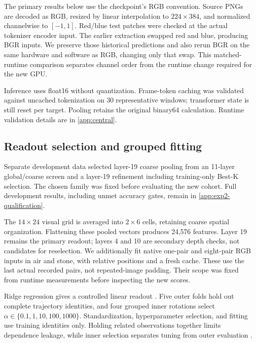 \documentclass{article}
\begin{document}
The primary results below use the checkpoint's RGB convention. Source PNGs are decoded as RGB, resized by linear interpolation to $224\times384$, and normalized channelwise to $[-1,1]$. Red/blue test patches were checked at the actual tokenizer encoder input. The earlier extraction swapped red and blue, producing BGR inputs. We preserve those historical predictions and also rerun BGR on the same hardware and software as RGB, changing only that swap. This matched-runtime comparison separates channel order from the runtime change required for the new GPU.

Inference uses float16 without quantization. Frame-token caching was validated against uncached tokenization on 30 representative windows; transformer state is still reset per target. Pooling retains the original binary64 calculation. Runtime validation details are in \autoref{app:central}.

\subsection{Readout selection and grouped fitting}
\label{sec:readouts}
Separate development data selected layer-19 coarse pooling from an 11-layer global/coarse screen and a layer-19 refinement including training-only Best-K selection. The chosen family was fixed before evaluating the new cohort. Full development results, including unmet accuracy gates, remain in \autoref{app:exp2-qualification}.

The $14\times24$ visual grid is averaged into $2\times6$ cells, retaining coarse spatial organization. Flattening these pooled vectors produces 24,576 features. Layer 19 remains the primary readout; layers 4 and 10 are secondary depth checks, not candidates for reselection. We additionally fit native one-pair and eight-pair RGB inputs in air and stone, with relative positions and a fresh cache. These use the last actual recorded pairs, not repeated-image padding. Their scope was fixed from runtime measurements before inspecting the new scores.

Ridge regression gives a controlled linear readout \citep{hoerl1970ridge}. Five outer folds hold out complete trajectory identities, and four grouped inner rotations select $\alpha\in\{0.1,1,10,100,1000\}$. Standardization, hyperparameter selection, and fitting use training identities only. Holding related observations together limits dependence leakage, while inner selection separates tuning from outer evaluation \citep{roberts2017crossvalidation,varma2006bias,cawley2010overfitting,varoquaux2018crossvalidation}.
\end{document}
